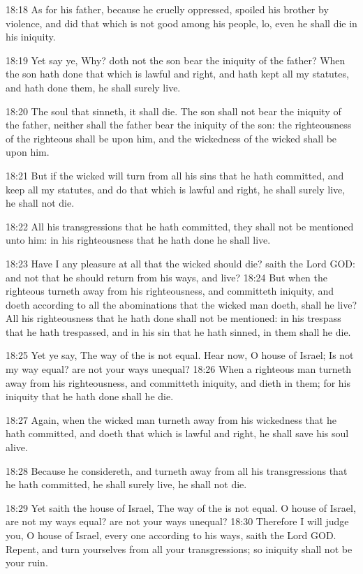 18:18 As for his father, because he cruelly oppressed, spoiled his
brother by violence, and did that which is not good among his people,
lo, even he shall die in his iniquity.

18:19 Yet say ye, Why? doth not the son bear the iniquity of the
father?  When the son hath done that which is lawful and right, and
hath kept all my statutes, and hath done them, he shall surely live.

18:20 The soul that sinneth, it shall die. The son shall not bear the
iniquity of the father, neither shall the father bear the iniquity of
the son: the righteousness of the righteous shall be upon him, and the
wickedness of the wicked shall be upon him.

18:21 But if the wicked will turn from all his sins that he hath
committed, and keep all my statutes, and do that which is lawful and
right, he shall surely live, he shall not die.

18:22 All his transgressions that he hath committed, they shall not be
mentioned unto him: in his righteousness that he hath done he shall
live.

18:23 Have I any pleasure at all that the wicked should die? saith the
Lord GOD: and not that he should return from his ways, and live?
18:24 But when the righteous turneth away from his righteousness, and
committeth iniquity, and doeth according to all the abominations that
the wicked man doeth, shall he live? All his righteousness that he
hath done shall not be mentioned: in his trespass that he hath
trespassed, and in his sin that he hath sinned, in them shall he die.

18:25 Yet ye say, The way of the \LORD is not equal. Hear now, O house
of Israel; Is not my way equal? are not your ways unequal?  18:26 When
a righteous man turneth away from his righteousness, and committeth
iniquity, and dieth in them; for his iniquity that he hath done shall
he die.

18:27 Again, when the wicked man turneth away from his wickedness that
he hath committed, and doeth that which is lawful and right, he shall
save his soul alive.

18:28 Because he considereth, and turneth away from all his
transgressions that he hath committed, he shall surely live, he shall
not die.

18:29 Yet saith the house of Israel, The way of the \LORD is not equal.
O house of Israel, are not my ways equal? are not your ways unequal?
18:30 Therefore I will judge you, O house of Israel, every one
according to his ways, saith the Lord GOD. Repent, and turn yourselves
from all your transgressions; so iniquity shall not be your ruin.

